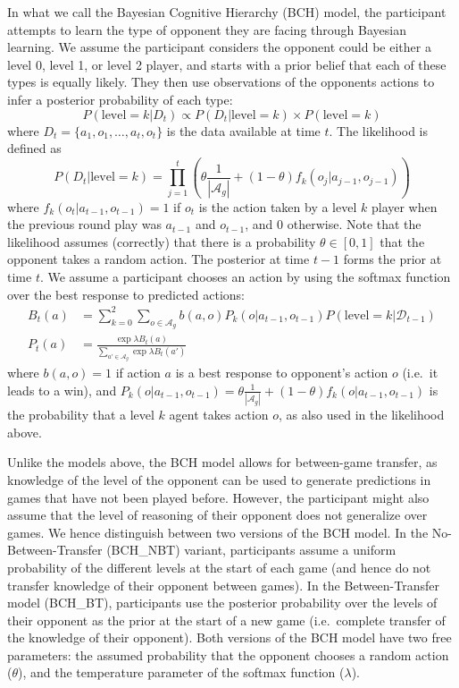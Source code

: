 \documentclass[man,floatsintext]{apa6}
\begin{document}
In what we call the Bayesian Cognitive Hierarchy (BCH) model, the participant attempts to learn the type of opponent they are facing through Bayesian learning. We assume the participant considers the opponent could be either a level 0, level 1, or level 2 player, and starts with a prior belief that each of these types is equally likely. They then use observations of the opponents actions to infer a posterior probability of each type:
\[ P(\text{level}=k | D_{t})  \propto  P(D_{t}|\text{level}=k ) \times P(\text{level}=k)\]
where \(D_{t} = \{a_1,o_1,\ldots,a_t,o_t\}\) is the data available at time \(t\). The likelihood is defined as
\[P(D_{t}|\text{level}=k) = \prod_{j=1}^t \left( \theta \frac{1}{|\mathcal{A}_g|} + (1-\theta) f_k(o_j|a_{j-1},o_{j-1})\right)\]
where \(f_k(o_t|a_{t-1},o_{t-1}) = 1\) if \(o_t\) is the action taken by a level \(k\) player when the previous round play was \(a_{t-1}\) and \(o_{t-1}\), and 0 otherwise. Note that the likelihood assumes (correctly) that there is a probability \(\theta \in [0,1]\) that the opponent takes a random action. The posterior at time \(t-1\) forms the prior at time \(t\). We assume a participant chooses an action by using the softmax function over the best response to predicted actions:
\[\begin{aligned} B_t(a) &= \sum_{k = 0}^2 \sum_{o \in \mathcal{A}_g} b(a,o) P_k(o|a_{t-1},o_{t-1})  P(\text{level}=k|\mathcal{D}_{t-1})\\
P_t(a) &= \frac{\exp{\lambda B_t(a)}}{\sum_{a' \in \mathcal{A}_g} \exp \lambda B_t(a')} \end{aligned}\]
where \(b(a,o) = 1\) if action \(a\) is a best response to opponent's action \(o\) (i.e.~it leads to a win), and \(P_k(o|a_{t-1},o_{t-1}) = \theta \frac{1}{|\mathcal{A}_g|} + (1-\theta) f_k(o|a_{t-1},o_{t-1})\) is the probability that a level \(k\) agent takes action \(o\), as also used in the likelihood above.

Unlike the models above, the BCH model allows for between-game transfer, as knowledge of the level of the opponent can be used to generate predictions in games that have not been played before. However, the participant might also assume that the level of reasoning of their opponent does not generalize over games. We hence distinguish between two versions of the BCH model. In the No-Between-Transfer (BCH\_NBT) variant, participants assume a uniform probability of the different levels at the start of each game (and hence do not transfer knowledge of their opponent between games). In the Between-Transfer model (BCH\_BT), participants use the posterior probability over the levels of their opponent as the prior at the start of a new game (i.e.~complete transfer of the knowledge of their opponent). Both versions of the BCH model have two free parameters: the assumed probability that the opponent chooses a random action (\(\theta\)), and the temperature parameter of the softmax function (\(\lambda\)).
\end{document}

